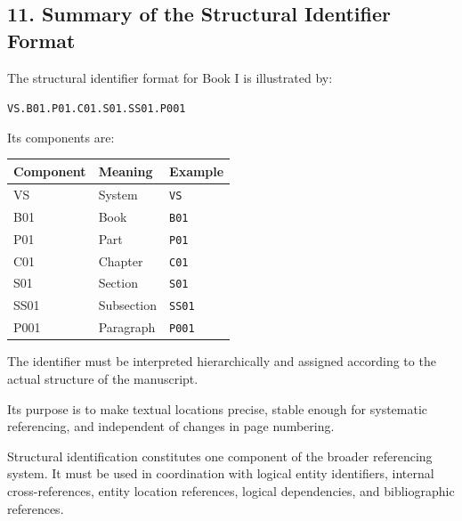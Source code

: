 \subsection*{11. Summary of the Structural
Identifier Format}

The structural identifier format
for Book I is illustrated by:

\begin{center}
    \texttt{VS.B01.P01.C01.S01.SS01.P001}
\end{center}

Its components are:

\begin{center}
\begin{tabular}{lll}
    \toprule
    \textbf{Component} & \textbf{Meaning}
        & \textbf{Example} \\
    \midrule
    VS & System & \texttt{VS} \\
    B01 & Book & \texttt{B01} \\
    P01 & Part & \texttt{P01} \\
    C01 & Chapter & \texttt{C01} \\
    S01 & Section & \texttt{S01} \\
    SS01 & Subsection & \texttt{SS01} \\
    P001 & Paragraph & \texttt{P001} \\
    \bottomrule
\end{tabular}
\end{center}

The identifier must be interpreted
hierarchically and assigned
according to the actual structure
of the manuscript.

Its purpose is to make textual
locations precise, stable enough
for systematic referencing, and
independent of changes in page
numbering.

Structural identification
constitutes one component of
the broader referencing system.
It must be used in coordination
with logical entity identifiers,
internal cross-references,
entity location references,
logical dependencies, and
bibliographic references.

\cleardoublepage

